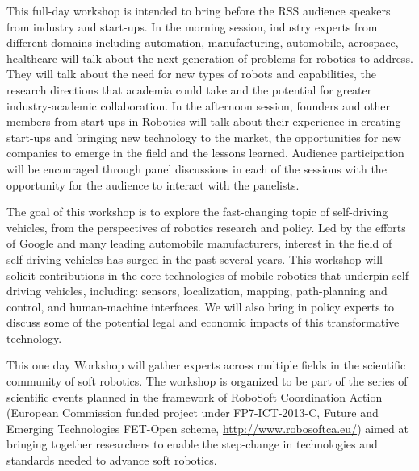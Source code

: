 \begin{spacing}{1.0}
{
This full-day workshop is intended to bring before the RSS audience speakers from industry and start-ups. In the morning session, industry experts from different domains including automation, manufacturing, automobile, aerospace, healthcare will talk about the next-generation of problems for robotics to address. They will talk about the need for new types of robots and capabilities, the research directions that academia could take and the potential for greater industry-academic collaboration. In the afternoon session, founders and other members from start-ups in Robotics will talk about their experience in creating start-ups and bringing new technology to the market, the opportunities for new companies to emerge in the field and the lessons learned. Audience participation will be encouraged through panel discussions in each of the sessions with the opportunity for the audience to interact with the panelists.
}


{
The goal of this workshop is to explore the fast-changing topic of self-driving vehicles, from the perspectives of robotics research and policy.  Led by the efforts of Google and many leading automobile manufacturers, interest in the field of self-driving vehicles has surged in the past several years.  This workshop will solicit contributions in the core technologies of mobile robotics that underpin self-driving vehicles, including: sensors, localization, mapping, path-planning and control, and human-machine interfaces.  We will also bring in policy experts  to discuss some of the potential legal and economic impacts of this transformative technology.
}


{
This one day Workshop will gather experts across multiple fields in the scientific community of soft robotics. The workshop is organized to be part of the series of scientific events planned in the framework of RoboSoft Coordination Action (European Commission funded project under FP7-ICT-2013-C, Future and Emerging Technologies FET-Open scheme, \url{http://www.robosoftca.eu/}) aimed at bringing together researchers to enable the step-change in technologies and standards needed to advance soft robotics.

}
\end{spacing}
